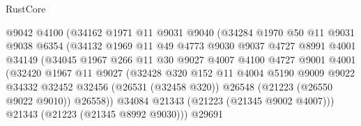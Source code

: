 \begin{lexlean}{RustCore}
\begin{coremodule}
                            @9042
                            @4100
                            (@34162
                              @1971
                              @11
                              @9031
                              @9040
                              (@34284
                                @1970
                                @50
                                @11
                                @9031
                                @9038
                                @6354
                                (@34132
                                  @1969
                                  @11
                                  @49
                                  @4773
                                  @9030
                                  @9037
                                  @4727
                                  @8991
                                  @4001
                                  @34149
                                  (@34045
                                    @1967
                                    @266
                                    @11
                                    @30
                                    @9027
                                    @4007
                                    @4100
                                    @4727
                                    @9001
                                    @4001
                                    (@32420
                                      @1967
                                      @11
                                      @9027
                                      (@32428
                                        @320
                                        @152
                                        @11
                                        @4004
                                        @5190
                                        @9009
                                        @9022
                                        @34332
                                        @32452
                                        @32456
                                        (@26531 (@32458 @320))
                                        @26548
                                        (@21223 (@26550 @9022 @9010))
                                        @26558))
                                    @34084
                                    @21343
                                    (@21223 (@21345 @9002 @4007)))
                                  @21343
                                  (@21223 (@21345 @8992 @9030)))
                                @29691

\end{coremodule}
\end{lexlean}
